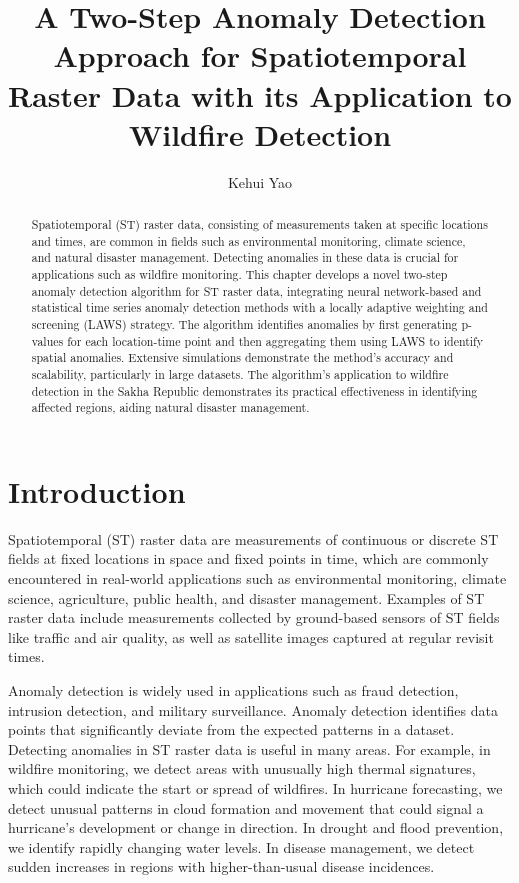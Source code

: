 \documentclass[11pt]{article}
\title{A Two-Step Anomaly Detection Approach for Spatiotemporal Raster Data with its Application to Wildfire Detection}
\author[1]{Kehui Yao}
\affil[1]{Department of Statistics, University of Wisconsin-Madison}
\date{}
\begin{document}
\maketitle

\begin{abstract}
Spatiotemporal (ST) raster data, consisting of measurements taken at specific locations and times, are common in fields such as environmental monitoring, climate science, and natural disaster management. Detecting anomalies in these data is crucial for applications such as wildfire monitoring. This chapter develops a novel two-step anomaly detection algorithm for ST raster data, integrating neural network-based and statistical time series anomaly detection methods with a locally adaptive weighting and screening (LAWS) strategy. The algorithm identifies anomalies by first generating p-values for each location-time point and then aggregating them using LAWS to identify spatial anomalies. Extensive simulations demonstrate the method's accuracy and scalability, particularly in large datasets. The algorithm's application to wildfire detection in the Sakha Republic demonstrates its practical effectiveness in identifying affected regions, aiding natural disaster management.

\end{abstract}

\section{Introduction}
Spatiotemporal (ST) raster data are measurements of continuous or discrete ST fields at fixed locations in space and fixed points in time, which are commonly encountered in real-world applications such as environmental monitoring, climate science, agriculture, public health, and disaster management. Examples of ST raster data include measurements collected by ground-based sensors of ST fields like traffic and air quality, as well as satellite images captured at regular revisit times. 
 
 Anomaly detection is widely used in applications such as fraud detection, intrusion detection, and military surveillance. Anomaly detection identifies data points that significantly deviate from the expected patterns in a dataset.  Detecting anomalies in ST raster data is useful in many areas. For example, in wildfire monitoring, we detect areas with unusually high thermal signatures, which could indicate the start or spread of wildfires. In hurricane forecasting, we detect unusual patterns in cloud formation and movement that could signal a hurricane's development or change in direction. In drought and flood prevention, we identify rapidly changing water levels. In disease management, we detect sudden increases in regions with higher-than-usual disease incidences.
\end{document}
